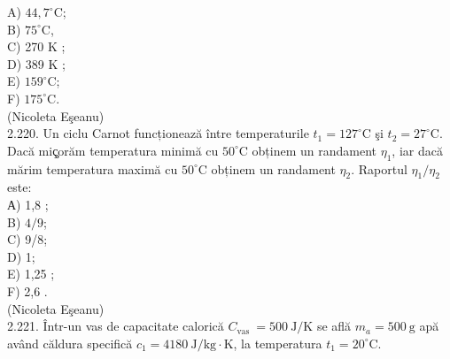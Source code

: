 \documentclass[10pt]{article}
\begin{document}
A) $44,7^{\circ} \mathrm{C}$;\\
B) $75^{\circ} \mathrm{C}$,\\
C) 270 K ;\\
D) 389 K ;\\
E) $159^{\circ} \mathrm{C}$;\\
F) $175^{\circ} \mathrm{C}$.\\
(Nicoleta Eşeanu)\\
2.220. Un ciclu Carnot funcționează între temperaturile $t_{1}=127^{\circ} \mathrm{C}$ şi $t_{2}=27^{\circ} \mathrm{C}$. Dacă miç̧orăm temperatura minimă cu $50^{\circ} \mathrm{C}$ obținem un randament $\eta_{1}$, iar dacă mărim temperatura maximă cu $50^{\circ} \mathrm{C}$ obținem un randament $\eta_{2}$. Raportul $\eta_{1} / \eta_{2}$ este:\\
А) 1,8 ;\\
B) $4 / 9$;\\
C) 9/8;\\
D) 1;\\
E) 1,25 ;\\
F) 2,6 .\\
(Nicoleta Eşeanu)\\
2.221. Într-un vas de capacitate calorică $C_{\text {vas }}=500 \mathrm{~J} / \mathrm{K}$ se află $m_{a}=500 \mathrm{~g}$ apă având căldura specifică $c_{1}=4180 \mathrm{~J} / \mathrm{kg} \cdot \mathrm{K}$, la temperatura $t_{1}=20^{\circ} \mathrm{C}$.
\end{document}
